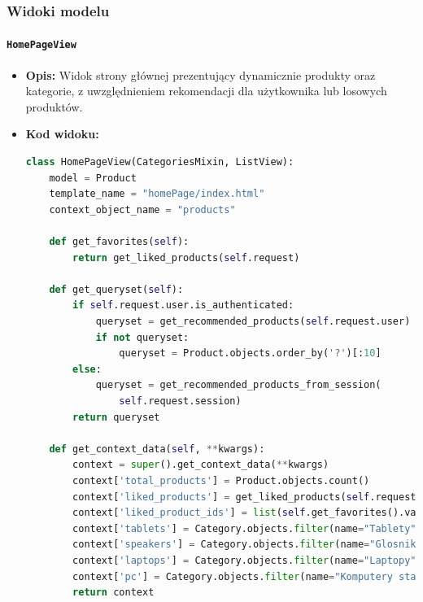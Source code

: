 \documentclass[12pt,a4paper,oneside]{article}
\theoremstyle{definition}
\numberwithin{equation}{section}
\begin{document}
\clearpage
\subsubsection{Widoki modelu}
\paragraph{\texttt{HomePageView}}
\begin{itemize}
    \item \textbf{Opis:} Widok strony głównej prezentujący dynamicznie produkty oraz kategorie, z uwzględnieniem rekomendacji dla użytkownika lub losowych produktów.
    \item \textbf{Kod widoku:}
    \begin{lstlisting}[language=Python, caption=Kod widoku HomePageView]
class HomePageView(CategoriesMixin, ListView):
    model = Product
    template_name = "homePage/index.html"
    context_object_name = "products"

    def get_favorites(self):
        return get_liked_products(self.request)

    def get_queryset(self):
        if self.request.user.is_authenticated:
            queryset = get_recommended_products(self.request.user)
            if not queryset:
                queryset = Product.objects.order_by('?')[:10]
        else:
            queryset = get_recommended_products_from_session(
                self.request.session)
        return queryset

    def get_context_data(self, **kwargs):
        context = super().get_context_data(**kwargs)
        context['total_products'] = Product.objects.count()
        context['liked_products'] = get_liked_products(self.request)
        context['liked_product_ids'] = list(self.get_favorites().values_list('id', flat=True))
        context['tablets'] = Category.objects.filter(name="Tablety").first()
        context['speakers'] = Category.objects.filter(name="Glosniki komputerowe").first()
        context['laptops'] = Category.objects.filter(name="Laptopy").first()
        context['pc'] = Category.objects.filter(name="Komputery stacjonarne").first()
        return context
    \end{lstlisting}


\end{itemize}
\end{document}
